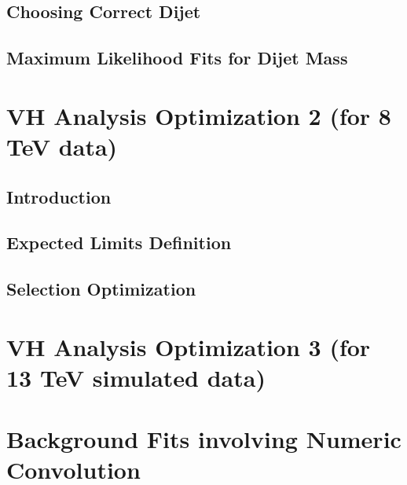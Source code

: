 \documentclass[12pt]{article}
\begin{document}
\subsection{Choosing Correct Dijet}
\subsection{Maximum Likelihood Fits for Dijet Mass}
\section{VH Analysis Optimization 2 (for 8 TeV data)}
\subsection{Introduction}
\subsection{Expected Limits Definition}
\subsection{Selection Optimization}
\section{VH Analysis Optimization 3 (for 13 TeV simulated data)}
\section{Background Fits involving Numeric Convolution}
\end{document}
